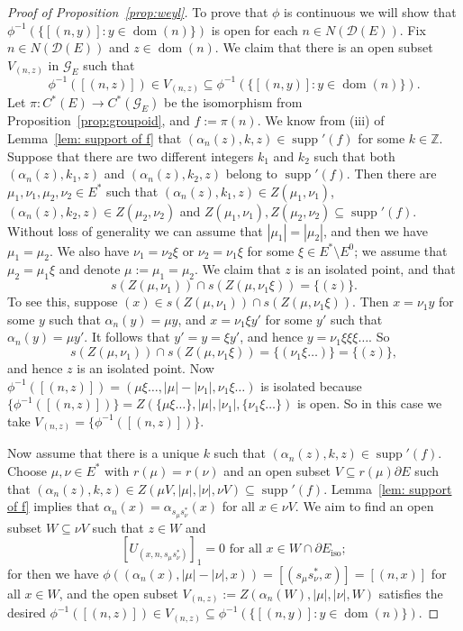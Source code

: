 \documentclass[12pt, a4paper]{amsart}
\numberwithin{equation}{section}
\theoremstyle{definition}
\theoremstyle{remark}
\begin{document}
\begin{proof}[Proof of Proposition~\ref{prop:weyl}]
To prove that $\phi$ is continuous we will show that 
$\phi^{-1}(\{[(n,y)]:y\in {{\operatorname{dom}}}(n)\})$ is open for each $n\in N({\mathcal{D}}(E))$. Fix 
$n\in 
N(\mathcal{D}(E))$ 
and 
$z\in{{\operatorname{dom}}}(n)$. We claim that there is an open subset $V_{(n,z)}$ in ${\mathcal{G}}_E$ 
such that 
\[
\phi^{-1}([(n,z)])\in V_{(n,z)}\subseteq \phi^{-1}(\{[(n,y)]:y\in 
{{\operatorname{dom}}}(n)\}).
\]
Let $\pi:C^*(E)\to C^*({\mathcal{G}}_E)$ be the isomorphism from 
Proposition~\ref{prop:groupoid}, and $f:=\pi(n)$. We know from (iii) of 
Lemma~\ref{lem: support of f} that $(\alpha_n(z),k,z)\in{\operatorname{supp}}'(f)$ for some 
$k\in{\mathbb{Z}}$. Suppose that there are two 
different 
integers $k_1$ and $k_2$ such that both $(\alpha_n(z),k_1,z)$ and 
$(\alpha_n(z),k_2,z)$ belong to ${\operatorname{supp}}'(f)$. Then there are 
$\mu_1,\nu_1,\mu_2,\nu_2\in E^*$ such that $(\alpha_n(z),k_1,z)\in 
Z(\mu_1,\nu_1)$, $(\alpha_n(z),k_2,z)\in Z(\mu_2,\nu_2)$ and 
$Z(\mu_1,\nu_1),Z(\mu_2,\nu_2)\subseteq {\operatorname{supp}}'(f)$. Without loss of generality 
we can 
assume that $|\mu_1|=|\mu_2|$, and then we have $\mu_1=\mu_2$. We also have 
$\nu_1=\nu_2\xi$ or $\nu_2=\nu_1\xi$ for some $\xi\in E^*\setminus E^0$; we 
assume that $\mu_2=\mu_1\xi$ and denote $\mu:=\mu_1=\mu_2$. We claim that $z$ 
is an isolated point, and that 
\[
s(Z(\mu,\nu_1))\cap 
s(Z(\mu,\nu_1\xi))=\{(z)\}.
\]   
To see this, suppose $(x)\in s(Z(\mu,\nu_1))\cap 
s(Z(\mu,\nu_1\xi))$. Then $x=\nu_1y$ for some $y$ such that $\alpha_n(y)=\mu 
y$, and $x=\nu_1\xi y'$ for some $y'$ such that $\alpha_n(y)=\mu y'$. It 
follows that $y'=y=\xi y'$, and hence $y=\nu_1\xi\xi\xi\dots$. So  
\[
s(Z(\mu,\nu_1))\cap 
s(Z(\mu,\nu_1\xi))=\{(\nu_1\xi\dots)\}=\{(z)\},
\]
and hence $z$ is an isolated point. Now 
$\phi^{-1}([(n,z)])=(\mu\xi\dots,|\mu|-|\nu_1|,\nu_1\xi\dots)$ is isolated 
because 
$\{\phi^{-1}([(n,z)])\}=Z(\{\mu\xi\dots\},|\mu|,|\nu_1|,\{\nu_1\xi\dots\})$ is 
open. So in this case we take $V_{(n,z)}=\{\phi^{-1}([(n,z)])\}$.

Now assume that there is a unique $k$ such that 
$(\alpha_n(z),k,z)\in{\operatorname{supp}}'(f)$. Choose $\mu,\nu\in E^*$ with $r(\mu)=r(\nu)$ 
and an open subset $V\subseteq r(\mu)\partial E$ such that 
$(\alpha_n(z),k,z)\in Z(\mu 
V,|\mu|,|\nu|,\nu V)\subseteq{\operatorname{supp}}'(f)$. Lemma~\ref{lem: support of f} implies 
that 
$\alpha_n(x)=\alpha_{s_\mu s_\nu^*}(x)$ for all $x\in \nu V$. We aim to find 
an open subset $W\subseteq \nu V$ such that $z\in W$ 
and 
\begin{equation}\label{eq: requirements of W}
[U_{(x,n,s_\mu s_\nu^*)}]_1=0\text{ for all }x\in W\cap\partial 
E_{{\operatorname{iso}}};
\end{equation} 
for then we have $\phi((\alpha_n(x),|\mu|-|\nu|,x))=[(s_\mu 
s_\nu^*,x)]=[(n,x)]$ for all $x\in W$, and 
the open subset 
$V_{(n,z)}:=Z(\alpha_n(W),|\mu|,|\nu|,W)$ 
satisfies the 
desired $\phi^{-1}([(n,z)])\in V_{(n,z)}\subseteq \phi^{-1}(\{[(n,y)]:y\in 
{{\operatorname{dom}}}(n)\})$.


\end{proof}
\end{document}
